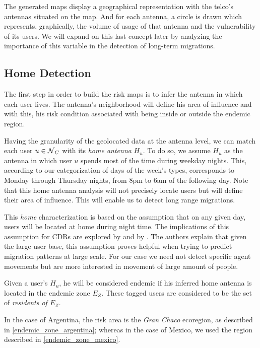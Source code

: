 The generated maps display a geographical representation with the telco's antennas situated on the map. And for each antenna, a circle is drawn which represents, graphically, the volume of usage of that antenna and the vulnerability of its users. We will expand on this last concept later by analyzing the importance of this variable in the detection of long-term migrations.

\subsection{Home Detection}\label{subsection:home_detection}

The first step in order to build the risk maps is to infer the antenna in which each user lives. The antenna's neighborhood will define his area of influence and with this, his risk condition associated with being inside or outside the endemic region.

Having the granularity of the geolocated data at the antenna level, we can match each user $u \in \operatorname{\mathcal{N}}_C$ with its \textit{home antenna} $H_u$. To do so, we assume $H_u$ as the antenna in which user $u$ spends most of the time during weekday nights. This, according to our categorization of days of the week's types, corresponds to Monday through Thursday nights, from 8pm to 6am of the following day. Note that this home antenna analysis will not precisely locate users but will define their area of influence. This will enable us to detect long range migrations.

This \textit{home} characterization is based on the assumption that on any given day, users will be located at home during night time. The implications of this assumption for  CDRs are explored by \cite{sarraute2015socialevents} and by \cite{csaji2012exploring}. The authors explain that given the large user base, this assumption proves helpful when trying to predict migration patterns at large scale. For our case we need not detect specific agent movements but are more interested in movement of large amount of people.

Given a user's $H_u$, he will be considered endemic if his inferred home antenna is located in the endemic zone $E_Z$. These tagged users are considered to be the set of \textit{residents of $E_Z$}.

In the case of Argentina, the risk area is the \textit{Gran Chaco} ecoregion, as described in \cref{endemic_zone_argentina};
whereas in the case of Mexico, we used the region described in \cref{endemic_zone_mexico}.


